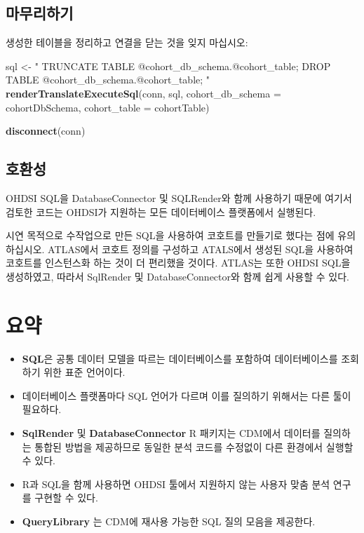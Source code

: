 \documentclass[11pt]{book}
\newenvironment{Shaded}{\begin{snugshade}}{\end{snugshade}}
\newcommand{\KeywordTok}[1]{\textcolor[rgb]{0.13,0.29,0.53}{\textbf{#1}}}
\newcommand{\DataTypeTok}[1]{\textcolor[rgb]{0.13,0.29,0.53}{#1}}
\newcommand{\StringTok}[1]{\textcolor[rgb]{0.31,0.60,0.02}{#1}}
\newcommand{\NormalTok}[1]{#1}
\theoremstyle{definition}
\theoremstyle{definition}
\theoremstyle{definition}
\theoremstyle{remark}
\let\BeginKnitrBlock\begin \let\EndKnitrBlock\end
\begin{document}
\subsection{마무리하기}

생성한 테이블을 정리하고 연결을 닫는 것을 잊지 마십시오:

\begin{Shaded}
\begin{Highlighting}[]
\NormalTok{sql <-}\StringTok{ "}
\StringTok{TRUNCATE TABLE @cohort_db_schema.@cohort_table;}
\StringTok{DROP TABLE @cohort_db_schema.@cohort_table;}
\StringTok{"}
\KeywordTok{renderTranslateExecuteSql}\NormalTok{(conn, sql,}
                          \DataTypeTok{cohort_db_schema =}\NormalTok{ cohortDbSchema,}
                          \DataTypeTok{cohort_table =}\NormalTok{ cohortTable)}

\KeywordTok{disconnect}\NormalTok{(conn)}
\end{Highlighting}
\end{Shaded}

\subsection{호환성}

OHDSI SQL을 DatabaseConnector 및 SQLRender와 함께 사용하기 때문에 여기서
검토한 코드는 OHDSI가 지원하는 모든 데이터베이스 플랫폼에서 실행된다.

시연 목적으로 수작업으로 만든 SQL을 사용하여 코호트를 만들기로 했다는
점에 유의하십시오. ATLAS에서 코호트 정의를 구성하고 ATALS에서 생성된
SQL을 사용하여 코호트를 인스턴스화 하는 것이 더 편리했을 것이다. ATLAS는
또한 OHDSI SQL을 생성하였고, 따라서 SqlRender 및 DatabaseConnector와
함께 쉽게 사용할 수 있다.

\section{요약}\label{-7}

\BeginKnitrBlock{rmdsummary}
\begin{itemize}
\item
  \textbf{SQL}은 공통 데이터 모델을 따르는 데이터베이스를 포함하여
  데이터베이스를 조회하기 위한 표준 언어이다.
\item
  데이터베이스 플랫폼마다 SQL 언어가 다르며 이를 질의하기 위해서는 다른
  툴이 필요하다.
\item
  \textbf{SqlRender} 및 \textbf{DatabaseConnector} R 패키지는 CDM에서
  데이터를 질의하는 통합된 방법을 제공하므로 동일한 분석 코드를 수정없이
  다른 환경에서 실행할 수 있다.
\item
  R과 SQL을 함께 사용하면 OHDSI 툴에서 지원하지 않는 사용자 맞춤 분석
  연구를 구현할 수 있다.
\item
  \textbf{QueryLibrary} 는 CDM에 재사용 가능한 SQL 질의 모음을 제공한다.
\end{itemize}
\EndKnitrBlock{rmdsummary}
\end{document}
